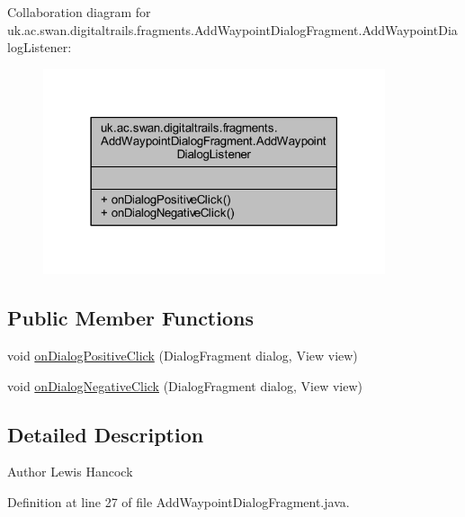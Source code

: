 Collaboration diagram for uk.\+ac.\+swan.\+digitaltrails.\+fragments.\+Add\+Waypoint\+Dialog\+Fragment.\+Add\+Waypoint\+Dialog\+Listener\+:
\nopagebreak
\begin{figure}[H]
\begin{center}
\leavevmode
\includegraphics[width=285pt]{interfaceuk_1_1ac_1_1swan_1_1digitaltrails_1_1fragments_1_1_add_waypoint_dialog_fragment_1_1_add5bb9d0ba0a6e395132d544255979983e}
\end{center}
\end{figure}
\subsection*{Public Member Functions}
\begin{DoxyCompactItemize}
\item 
void \hyperlink{interfaceuk_1_1ac_1_1swan_1_1digitaltrails_1_1fragments_1_1_add_waypoint_dialog_fragment_1_1_add_waypoint_dialog_listener_a3bd6666341faffa16f688119d97753f3}{on\+Dialog\+Positive\+Click} (Dialog\+Fragment dialog, View view)
\item 
void \hyperlink{interfaceuk_1_1ac_1_1swan_1_1digitaltrails_1_1fragments_1_1_add_waypoint_dialog_fragment_1_1_add_waypoint_dialog_listener_a8cbf919c183c0e8048a90e6bd30fdf04}{on\+Dialog\+Negative\+Click} (Dialog\+Fragment dialog, View view)
\end{DoxyCompactItemize}


\subsection{Detailed Description}
\begin{DoxyAuthor}{Author}
Lewis Hancock 
\end{DoxyAuthor}


Definition at line 27 of file Add\+Waypoint\+Dialog\+Fragment.\+java.



